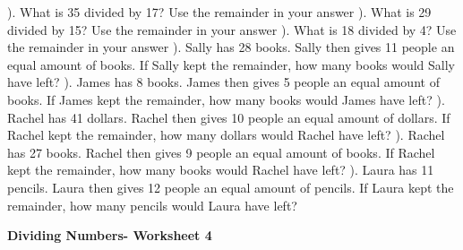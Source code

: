 \documentclass{article}%
\begin{document}
\newline%
\newline%
). What is 35 divided by 17? Use the remainder in your answer%
\newline%
\newline%
). What is 29 divided by 15? Use the remainder in your answer%
\newline%
\newline%
). What is 18 divided by 4? Use the remainder in your answer%
\newline%
\newline%
). Sally has 28 books. Sally then gives 11 people an equal amount of books. If Sally kept the remainder, how many books would Sally have left?%
\newline%
\newline%
). James has 8 books. James then gives 5 people an equal amount of books. If James kept the remainder, how many books would James have left?%
\newline%
\newline%
). Rachel has 41 dollars. Rachel then gives 10 people an equal amount of dollars. If Rachel kept the remainder, how many dollars would Rachel have left?%
\newline%
\newline%
). Rachel has 27 books. Rachel then gives 9 people an equal amount of books. If Rachel kept the remainder, how many books would Rachel have left?%
\newline%
\newline%
). Laura has 11 pencils. Laura then gives 12 people an equal amount of pencils. If Laura kept the remainder, how many pencils would Laura have left?%
\newline%
\newline%
\newline%
\pagebreak%
\large%
\begin{center}%
\textbf{Dividing Numbers- Worksheet 4}%
\newline%
\newline%
\newline%
\end{center} \normalsize%
\end{document}
